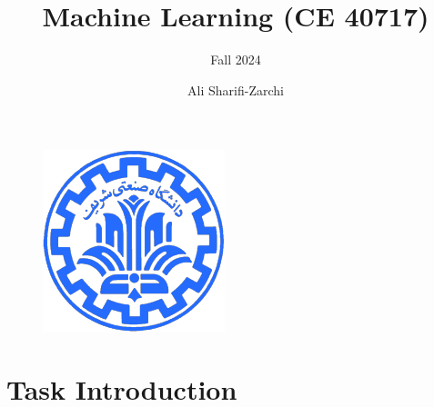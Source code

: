 \documentclass[serif, aspectratio=169]{beamer}
\author{Ali Sharifi-Zarchi}
\title{Machine Learning (CE 40717)}
\subtitle{Fall 2024}
\institute{
    CE Department \\
    Sharif University of Technology
}
\begin{document}
\begin{frame}
    \titlepage
    \vspace*{-0.6cm}
    \begin{figure}[htpb]
        \begin{center}
            \includegraphics[keepaspectratio, scale=0.25]{pic/sharif-main-logo.png}
        \end{center}
    \end{figure}
\end{frame}

\begin{frame}    
\tableofcontents[sectionstyle=show,
subsectionstyle=show/shaded/hide,
subsubsectionstyle=show/shaded/hide]
\end{frame}



\section{Task Introduction}
\end{document}
